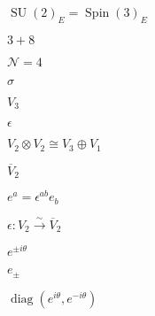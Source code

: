 \begin{preview}
\setcounter{equation}{0}%
\( \operatorname{SU}(2)_E = \operatorname{Spin}(3)_E \)
\end{preview}

\begin{preview}
\setcounter{equation}{0}%
\( 3+8 \)
\end{preview}

\begin{preview}
\setcounter{equation}{0}%
\( \mathcal{N}=4 \)
\end{preview}

\begin{preview}
\setcounter{equation}{0}%
\( \sigma \)
\end{preview}

\begin{preview}
\setcounter{equation}{0}%
\( V_3 \)
\end{preview}

\begin{preview}
\setcounter{equation}{0}%
\( \epsilon \)
\end{preview}

\begin{preview}
\setcounter{equation}{0}%
\( V_2 \otimes  V_2 \cong V_3 \oplus V_1 \)
\end{preview}

\begin{preview}
\setcounter{equation}{0}%
\( \overline{V}_2 \)
\end{preview}

\begin{preview}
\setcounter{equation}{0}%
\( e^a  = \epsilon^{ab}e_b\)
\end{preview}

\begin{preview}
\setcounter{equation}{0}%
\( \epsilon : V_2 \xrightarrow{\sim} \overline{V}_{2} \)
\end{preview}

\begin{preview}
\setcounter{equation}{0}%
\( e^{\pm i \theta} \)
\end{preview}

\begin{preview}
\setcounter{equation}{0}%
\( e_{\pm} \)
\end{preview}

\begin{preview}
\setcounter{equation}{0}%
\( \operatorname{diag}(e^{i\theta},e^{-i\theta}) \)
\end{preview}

